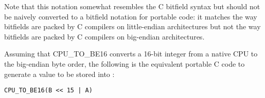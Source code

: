Note that this notation somewhat resembles the C bitfield syntax but
should not be naively converted to a bitfield notation for portable
code: it matches the way bitfields are packed by C compilers on
little-endian architectures but not the way bitfields are packed by C
compilers on big-endian architectures.

Assuming that CPU_TO_BE16 converts a 16-bit integer from a native
CPU to the big-endian byte order, the following is the equivalent
portable C code to generate a value to be stored into :
\begin{lstlisting}
CPU_TO_BE16(B << 15 | A)
\end{lstlisting}

\newpage

